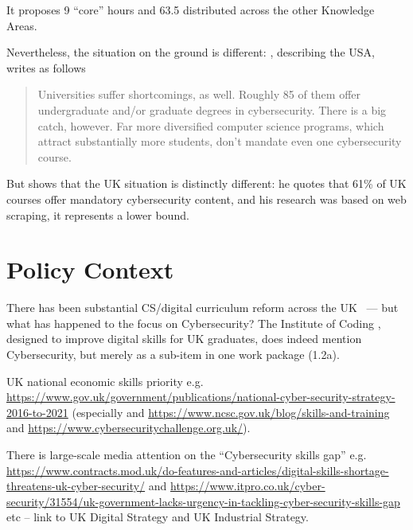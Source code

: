 \documentclass[sigconf,anonymous]{acmart}
\begin{document}
It proposes 9 ``core'' hours and 63.5 distributed across the other Knowledge Areas.
\par
Nevertheless, the situation on the ground is different: \cite{Ackerman2019a}, describing the USA, writes as follows
\begin{quote}
Universities suffer shortcomings, as well. Roughly 85 of them offer undergraduate and/or graduate degrees in cybersecurity. There is a big catch, however. Far more diversified computer science programs, which attract substantially more students, don't mandate even one cybersecurity course.
\end{quote}

But \cite[Table 1]{Ruiz2019a} shows that the UK situation is distinctly different: he quotes that 61\% of UK courses offer mandatory cybersecurity content, and his research was based on web scraping, it represents a lower bound.
\section{Policy Context}



There has been substantial CS/digital curriculum reform across the
UK~\cite{crick+sentance:2011,brown-et-al:sigcse2013,wgictreview:2013,brown-et-al:toce2014,moller+crick:jce2018}
--- but what has happened to the focus on Cybersecurity?  The Institute of Coding \cite{Davenportetal2019a}, designed to improve digital skills for UK graduates, does indeed mention Cybersecurity, but merely as a sub-item in one work package (1.2a).

UK national economic skills priority
e.g. \url{https://www.gov.uk/government/publications/national-cyber-security-strategy-2016-to-2021}
(especially \cite{JCNSS2018a}
and \url{https://www.ncsc.gov.uk/blog/skills-and-training} and
\url{https://www.cybersecuritychallenge.org.uk/}). 

There is large-scale media
attention on the ``Cybersecurity skills gap''
e.g. \url{https://www.contracts.mod.uk/do-features-and-articles/digital-skills-shortage-threatens-uk-cyber-security/}
and
\url{https://www.itpro.co.uk/cyber-security/31554/uk-government-lacks-urgency-in-tackling-cyber-security-skills-gap}
etc -- link to UK Digital Strategy and UK Industrial Strategy.
\end{document}
